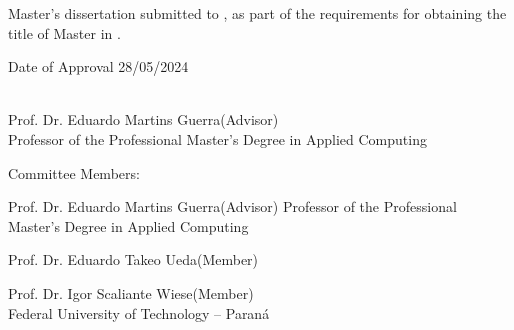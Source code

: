 \begingroup

\begin{center}
\authorname

\vspace{1.5cm}

\doctitle
\end{center}

\vspace{2cm}

\begin{flushright}
\begin{minipage}{.5\textwidth}


Master's dissertation submitted to \universityfull, as part of the requirements for obtaining the title of Master in \knowledgearea.

\vspace{2cm}

Date of Approval 28/05/2024

\vspace{2cm}

\hrulefill\\
Prof. Dr. Eduardo Martins Guerra\space(Advisor)\\
Professor of the Professional Master's Degree in Applied Computing\\
\end{minipage}
\end{flushright}

\vspace{1.0 cm}

\begin{flushleft}
Committee Members:

Prof. Dr. Eduardo Martins Guerra\space(Advisor)\newline
Professor of the Professional Master's Degree in Applied Computing


Prof. Dr. Eduardo Takeo Ueda\space(Member)\\
\universityfull

Prof. Dr. Igor Scaliante Wiese\space(Member)\\
Federal University of Technology – Paraná
\end{flushleft}

\endgroup
